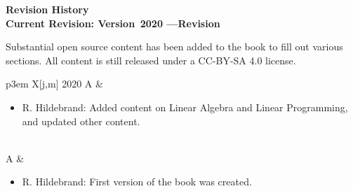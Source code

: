 \setcounter{page}{1}
\thispagestyle{empty}


\vspace{-3em}

\vspace{-2em}

%


\setlength{\parskip}{0pt}

\begin{center}
\fontsize{12pt}{14pt}\selectfont\textcolor{titletextcolour}{\textbf{Revision History \\ \smallskip  Current Revision: Version\, 2020%
\enskip---\enskip Revision\,\revision }}
\end{center}

{\footnotesize

\begin{center}
Substantial open source content has been added to the book to fill out various sections.   All content is still released under a CC-BY-SA 4.0 license.
\end{center}

\begin{tabu}{p{3em} X[j,m]} %
\hline
\textcolor{titletextcolour}{2020} \textcolor{titletextcolour}{A} & \begin{itemize} \item R. Hildebrand: Added content on Linear Algebra and Linear Programming, and updated other content.    \end{itemize} \\   A &  \begin{itemize} \item R. Hildebrand: First version of the book was created. \end{itemize} \\ \end{tabu}
\medskip
}


\setlength{\parskip}{\baselineskip}


